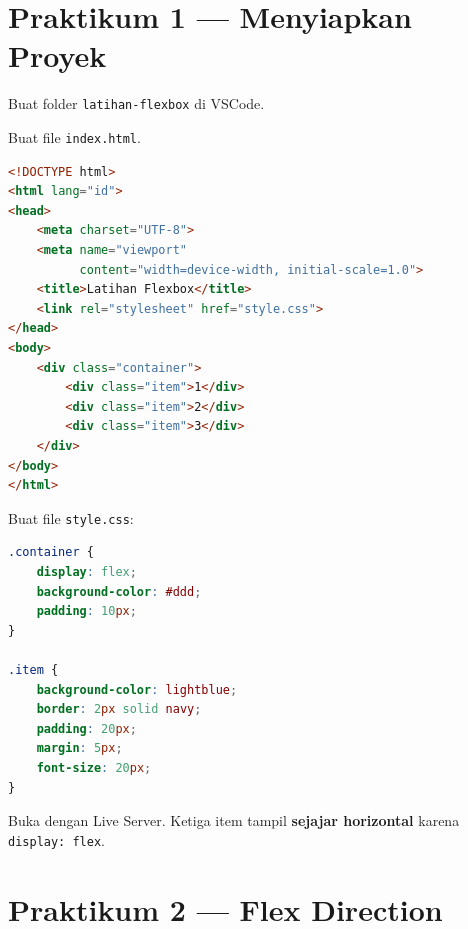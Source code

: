 \section{Praktikum 1 --- Menyiapkan Proyek}
\label{sec:flex-praktik-1}

\begin{langkah}
  \item Buat folder \texttt{latihan-flexbox} di VSCode.
  \item Buat file \texttt{index.html}.
\end{langkah}

\begin{lstlisting}[language=HTML, caption={Struktur index.html}, label={lst:flex-index}]
<!DOCTYPE html>
<html lang="id">
<head>
    <meta charset="UTF-8">
    <meta name="viewport"
          content="width=device-width, initial-scale=1.0">
    <title>Latihan Flexbox</title>
    <link rel="stylesheet" href="style.css">
</head>
<body>
    <div class="container">
        <div class="item">1</div>
        <div class="item">2</div>
        <div class="item">3</div>
    </div>
</body>
</html>
\end{lstlisting}

\begin{langkah}
  \item Buat file \texttt{style.css}:
\end{langkah}

\begin{lstlisting}[language=CSS, caption={Gaya dasar flexbox}, label={lst:flex-style}]
.container {
    display: flex;
    background-color: #ddd;
    padding: 10px;
}

.item {
    background-color: lightblue;
    border: 2px solid navy;
    padding: 20px;
    margin: 5px;
    font-size: 20px;
}
\end{lstlisting}

\begin{langkah}
  \item Buka dengan Live Server. Ketiga item tampil \textbf{sejajar horizontal} karena \texttt{display: flex}.
\end{langkah}

\section{Praktikum 2 --- Flex Direction}
\label{sec:flex-praktik-2}


